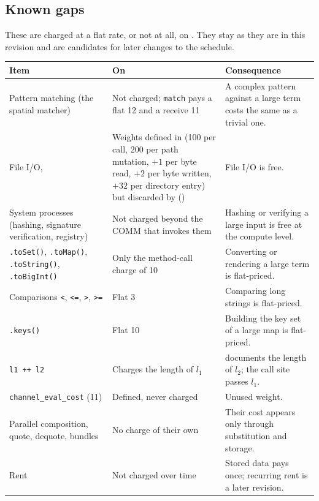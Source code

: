 \subsection{Known gaps}

These are charged at a flat rate, or not at all, on . They stay as they are in this revision and are candidates for later changes to the schedule.

\begin{longtable}{@{}P{4.6cm}P{4.8cm}P{5.2cm}@{}}
\toprule
\textbf{Item} & \textbf{On } & \textbf{Consequence} \\
\midrule
\endhead
Pattern matching (the spatial matcher) & Not charged; \texttt{match} pays a flat 12 and a receive 11 & A complex pattern against a large term costs the same as a trivial one. \\
File I/O,  & Weights defined in  (100 per call, 200 per path mutation, $+1$ per byte read, $+2$ per byte written, $+32$ per directory entry) but discarded by  () & File I/O is free. \\
System processes (hashing, signature verification, registry) & Not charged beyond the COMM that invokes them & Hashing or verifying a large input is free at the compute level. \\
\texttt{.toSet()}, \texttt{.toMap()}, \texttt{.toString()}, \texttt{.toBigInt()} & Only the method-call charge of 10 & Converting or rendering a large term is flat-priced. \\
Comparisons \texttt{<}, \texttt{<=}, \texttt{>}, \texttt{>=} & Flat 3 & Comparing long strings is flat-priced. \\
\texttt{.keys()} & Flat 10 & Building the key set of a large map is flat-priced. \\
\texttt{l1 ++ l2} & Charges the length of $l_1$ &  documents the length of $l_2$; the call site passes $l_1$. \\
\texttt{channel\_eval\_cost} (11) & Defined, never charged & Unused weight. \\
Parallel composition, quote, dequote, bundles & No charge of their own & Their cost appears only through substitution and storage. \\
Rent & Not charged over time & Stored data pays once; recurring rent is a later revision. \\
\bottomrule
\end{longtable}
